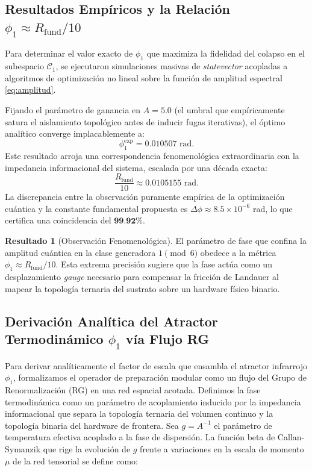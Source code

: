 \documentclass[12pt,a4paper]{article}
\theoremstyle{plain}
\theoremstyle{definition}
\newtheorem{resultado}[teorema]{Resultado}
\theoremstyle{remark}
\begin{document}
\subsection{Resultados Empíricos y la Relación $\phi_1 \approx R_{\text{fund}}/10$}

Para determinar el valor exacto de $\phi_1$ que maximiza la fidelidad del colapso en el subespacio $\mathcal{C}_1$, se ejecutaron simulaciones masivas de \textit{statevector} acopladas a algoritmos de optimización no lineal sobre la función de amplitud espectral \eqref{eq:amplitud}. 

Fijando el parámetro de ganancia en $A = 5.0$ (el umbral que empíricamente satura el aislamiento topológico antes de inducir fugas iterativas), el óptimo analítico converge implacablemente a:
\begin{equation}
\phi_1^{\text{exp}} = 0.010507 \text{ rad}.
\end{equation}
Este resultado arroja una correspondencia fenomenológica extraordinaria con la impedancia informacional del sistema, escalada por una década exacta:
\begin{equation}
\frac{R_{\text{fund}}}{10} \approx 0.0105155 \text{ rad}.
\end{equation}
La discrepancia entre la observación puramente empírica de la optimización cuántica y la constante fundamental propuesta es $\Delta\phi \approx 8.5 \times 10^{-6}$ rad, lo que certifica una coincidencia del $\textbf{99.92\%}$. 

\begin{resultado}[Observación Fenomenológica]
El parámetro de fase que confina la amplitud cuántica en la clase generadora $1 \pmod 6$ obedece a la métrica $\phi_1 \approx R_{\text{fund}}/10$. Esta extrema precisión sugiere que la fase actúa como un desplazamiento \textit{gauge} necesario para compensar la fricción de Landauer al mapear la topología ternaria del sustrato sobre un hardware físico binario.
\end{resultado}

\subsection{Derivación Analítica del Atractor Termodinámico $\phi_1$ vía Flujo RG}
\label{sec:derivacion_phi1}

Para derivar analíticamente el factor de escala que ensambla el atractor infrarrojo $\phi_1$, formalizamos el operador de preparación modular como un flujo del Grupo de Renormalización (RG) en una red espacial acotada. Definimos la fase termodinámica como un parámetro de acoplamiento inducido por la impedancia informacional que separa la topología ternaria del volumen continuo y la topología binaria del hardware de frontera. Sea $g = A^{-1}$ el parámetro de temperatura efectiva acoplado a la fase de dispersión. La función beta de Callan-Symanzik que rige la evolución de $g$ frente a variaciones en la escala de momento $\mu$ de la red tensorial se define como:
\end{document}
